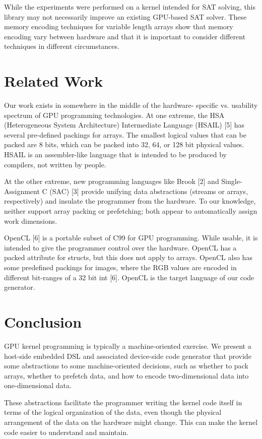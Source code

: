 \documentclass[conference]{IEEEtran}
\begin{document}
While the experiments were performed on a kernel intended for SAT solving, this library may not necessarily improve an existing GPU-based SAT solver. These memory encoding techniques for variable length arrays show that memory encoding vary between hardware and that it is important to consider different techniques in different circumstances.

\section*{Related Work}
Our work exists in somewhere in the middle of the hardware- specific vs. usability spectrum of GPU programming technologies. At one extreme, the HSA (Heterogeneous System Architecture) Intermediate Language (HSAIL) [5] has several pre-defined packings for arrays. The smallest logical values that can be packed are 8 bits, which can be packed into 32, 64, or 128 bit physical values. HSAIL is an assembler-like language that is intended to be produced by compilers, not written by people.
					
At the other extreme, new programming languages like Brook [2] and Single-Assignment C (SAC) [3] provide unifying data abstractions (streams or arrays, respectively) and insulate the programmer from the hardware. To our knowledge, neither support array packing or prefetching; both appear to automatically assign work dimensions.
					
OpenCL [6] is a portable subset of C99 for GPU programming. While usable, it is intended to give the programmer control over the hardware. OpenCL has a packed attribute for structs, but this does not apply to arrays. OpenCL also has some predefined packings for images, where the RGB values are encoded in different bit-ranges of a 32 bit int [6]. OpenCL is the target language of our code generator.

\section*{Conclusion}
GPU kernel programming is typically a machine-oriented exercise. We present a host-side embedded DSL and associated device-side code generator that provide some abstractions to some machine-oriented decisions, such as whether to pack arrays, whether to prefetch data, and how to encode two-dimensional data into one-dimensional data. 

These abstractions facilitate the programmer writing the kernel code itself in terms of the logical organization of the data, even though the physical arrangement of the data on the hardware might change. This can make the kernel code easier to understand and maintain.
\end{document}
